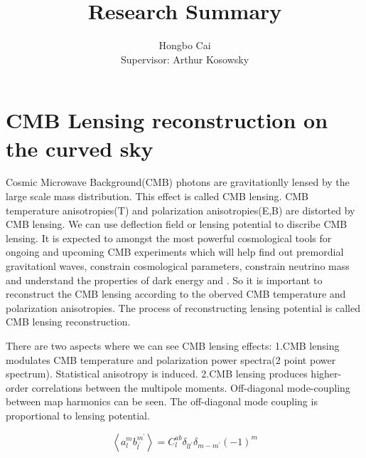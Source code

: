 \documentclass[12pt, notitlepage, onecolumn, amsmath, amssymb, aps]{revtex4-1}
\title{}
\begin{document}
\title{Research Summary}
\author{Hongbo Cai \\{\small Supervisor: Arthur Kosowsky}}
\maketitle
\newcommand{\edit}[1]{\textcolor{red}{(#1)}}
\vspace{-1.5cm}
\section{CMB Lensing reconstruction on the curved sky}
\label{sec:org8852578}


Cosmic Microwave Background(CMB) photons are gravitationlly lensed by the large scale mass distribution. This effect is called CMB lensing. CMB temperature anisotropies(T) and polarization anisotropies(E,B) are distorted by CMB lensing. We can use deflection field or lensing potential to discribe CMB lensing\cite{Lewis:2006fu}. It is expected to amongst the most powerful cosmological tools for ongoing and upcoming CMB experiments which will help find out premordial gravitationl waves, constrain cosmological parameters, constrain neutrino mass and understand the properties of dark energy and . So it is important to reconstruct the CMB lensing according to the oberved CMB temperature and polarization anisotropies. The process of reconstructing lensing potential is called CMB lensing reconstruction.

There are two aspects where we can see CMB lensing effects:
1.CMB lensing modulates CMB temperature and polarization power spectra(2 point power spectrum). Statistical anisotropy is induced.
2.CMB lensing produces higher-order correlations between the multipole moments. Off-diagonal mode-coupling between map harmonics can be seen. The off-diagonal mode coupling is proportional to lensing potential.\cite{Hu:2001kj}

\begin{equation}
  \left\langle a_{l}^{m} b_{l^{\prime}}^{m^{\prime}}\right\rangle= C_{l}^{a b} \delta_{l l^{\prime}} \delta_{m-m^{\prime}}(-1)^{m}
\end{equation}
\end{document}
